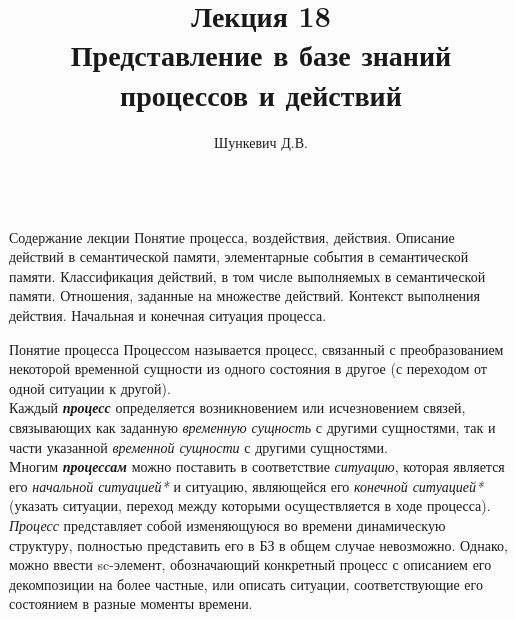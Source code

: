 \title{Лекция 18\\Представление в базе знаний процессов и действий}
\author[]{Шункевич Д.В.}

\begin{frame}
	\titlepage
\end{frame}

\begin{frame}{\\Содержание лекции}
	\topline
	\justifying
	Понятие процесса, воздействия, действия. Описание действий в семантической памяти, элементарные события в семантической памяти. Классификация действий, в том числе выполняемых в семантической памяти. Отношения, заданные на множестве действий. Контекст выполнения действия. Начальная и конечная ситуация процесса. 
\end{frame}

\begin{frame}{\large Понятие процесса}
\vspace{20}
    Процессом называется процесс, связанный с преобразованием некоторой временной сущности из одного состояния в другое (с переходом от одной ситуации к другой).\\
    Каждый \textbf{\textit{процесс}} определяется возникновением или исчезновением связей, связывающих как заданную \textit{временную сущность} с другими сущностями, так и части указанной \textit{временной сущности} с другими сущностями.\\
    Многим \textit{\textbf{процессам}} можно поставить в соответствие \textit{ситуацию}, которая является его \textit{начальной ситуацией*} и ситуацию, являющейся его \textit{конечной ситуацией*} (указать ситуации, переход между которыми осуществляется в ходе процесса).\\
    \textit{Процесс} представляет собой изменяющуюся во времени динамическую структуру, полностью представить его в БЗ в общем случае невозможно. Однако, можно ввести sc-элемент, обозначающий конкретный процесс с описанием его декомпозиции на более частные, или описать ситуации, соответствующие его состоянием в разные моменты времени.
\end{frame}


